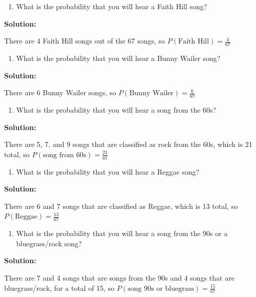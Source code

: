 \documentclass[]{book}
\providecommand{\tightlist}{%
  \setlength{\itemsep}{0pt}\setlength{\parskip}{0pt}}
\begin{document}
\begin{enumerate}
\def\labelenumi{\alph{enumi}.}
\tightlist
\item
  What is the probability that you will hear a Faith Hill song?
\end{enumerate}

\textbf{Solution:}

There are 4 Faith Hill songs out of the 67 songs, so \(P(\text{Faith Hill})=\frac{4}{67}\)

\begin{enumerate}
\def\labelenumi{\alph{enumi}.}
\setcounter{enumi}{1}
\tightlist
\item
  What is the probability that you will hear a Bunny Wailer song?
\end{enumerate}

\textbf{Solution:}

There are 6 Bunny Wailer songs, so \(P(\text{Bunny Wailer})=\frac{6}{67}\)

\begin{enumerate}
\def\labelenumi{\alph{enumi}.}
\setcounter{enumi}{2}
\tightlist
\item
  What is the probability that you will hear a song from the 60s?
\end{enumerate}

\textbf{Solution:}

There are 5, 7, and 9 songs that are classified as rock from the 60s, which is 21 total, so \(P(\text{song from 60s})=\frac{21}{67}\)

\begin{enumerate}
\def\labelenumi{\alph{enumi}.}
\setcounter{enumi}{3}
\tightlist
\item
  What is the probability that you will hear a Reggae song?
\end{enumerate}

\textbf{Solution:}

There are 6 and 7 songs that are classified as Reggae, which is 13 total, so \(P(\text{Reggae})=\frac{13}{67}\)

\begin{enumerate}
\def\labelenumi{\alph{enumi}.}
\setcounter{enumi}{4}
\tightlist
\item
  What is the probability that you will hear a song from the 90s or a
  bluegrass/rock song?
\end{enumerate}

\textbf{Solution:}

There are 7 and 4 songs that are songs from the 90s and 4 songs that are bluegrass/rock, for a total of 15, so \(P(\text{song 90s or bluegrass})=\frac{15}{67}\)
\end{document}
